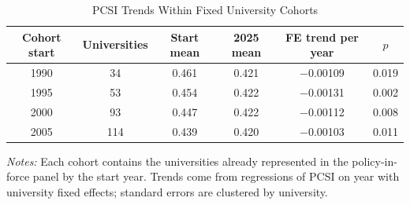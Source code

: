 \begin{table}[htbp]
\centering
\small
\caption{PCSI Trends Within Fixed University Cohorts}
\label{tab:cohorts}
\begin{threeparttable}
\begin{tabular}{cccccc}
\toprule
Cohort start & Universities & Start mean & 2025 mean & FE trend per year & $p$ \\
\midrule
1990 & 34 & 0.461 & 0.421 & $-$0.00109 & 0.019 \\
1995 & 53 & 0.454 & 0.422 & $-$0.00131 & 0.002 \\
2000 & 93 & 0.447 & 0.422 & $-$0.00112 & 0.008 \\
2005 & 114 & 0.439 & 0.420 & $-$0.00103 & 0.011 \\
\bottomrule
\end{tabular}
\begin{tablenotes}[flushleft]\footnotesize
\item \textit{Notes:} Each cohort contains the universities already represented in the policy-in-force panel by the start year. Trends come from regressions of PCSI on year with university fixed effects; standard errors are clustered by university.
\end{tablenotes}
\end{threeparttable}
\end{table}
